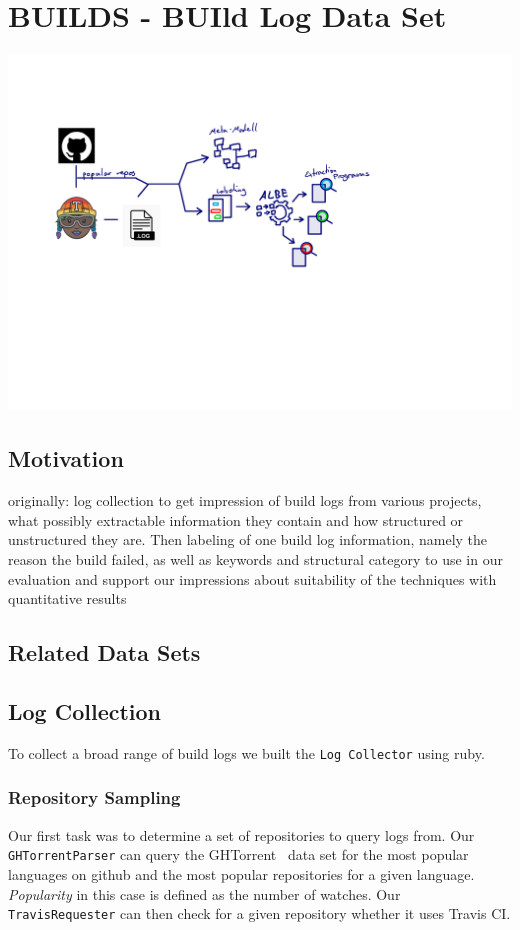 \documentclass[\myrootdir/main.tex]{subfiles}
\begin{document}
\chapter{BUILDS - BUIld Log Data Set}
\includegraphics[page=5, width=\textwidth, trim={0.5cm 0.5cm 0.5cm 0.5cm}, clip]{img/flow-of-research.pdf}

\label{sec:data-set}
\section{Motivation}
originally: log collection to get impression of build logs from various projects, what possibly extractable information they contain and how structured or unstructured they are.
Then labeling of one build log information, namely the reason the build failed, as well as keywords and structural category to use in our evaluation and support our impressions about suitability of the techniques with quantitative results

\section{Related Data Sets}

\section{Log Collection}
To collect a broad range of build logs we built the \texttt{Log Collector} using ruby.

\subsection{Repository Sampling}
Our first task was to determine a set of repositories to query logs from.
Our \texttt{GHTorrentParser} can query the GHTorrent~\cite{gousios2013ghtorrent} data set for the most popular languages on github and the most popular repositories for a given language.
\emph{Popularity} in this case is defined as the number of watches.
Our \texttt{TravisRequester} can then check for a given repository whether it uses Travis CI.
\end{document}
